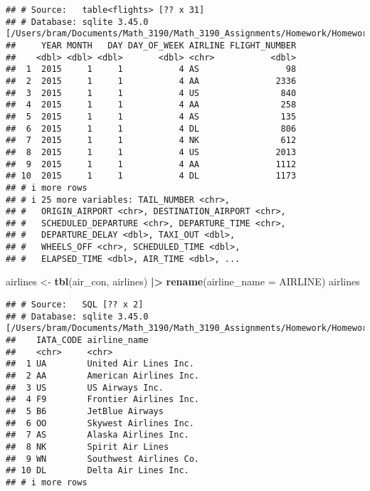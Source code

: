 \documentclass[
]{article}
\newenvironment{Shaded}{\begin{snugshade}}{\end{snugshade}}
\newcommand{\AttributeTok}[1]{\textcolor[rgb]{0.13,0.29,0.53}{#1}}
\newcommand{\FunctionTok}[1]{\textcolor[rgb]{0.13,0.29,0.53}{\textbf{#1}}}
\newcommand{\NormalTok}[1]{#1}
\newcommand{\OtherTok}[1]{\textcolor[rgb]{0.56,0.35,0.01}{#1}}
\newcommand{\SpecialCharTok}[1]{\textcolor[rgb]{0.81,0.36,0.00}{\textbf{#1}}}
\newcommand{\StringTok}[1]{\textcolor[rgb]{0.31,0.60,0.02}{#1}}
\begin{document}
\begin{verbatim}
## # Source:   table<flights> [?? x 31]
## # Database: sqlite 3.45.0 [/Users/bram/Documents/Math_3190/Math_3190_Assignments/Homework/Homework_2/flight_data/airBTS.sqlite]
##     YEAR MONTH   DAY DAY_OF_WEEK AIRLINE FLIGHT_NUMBER
##    <dbl> <dbl> <dbl>       <dbl> <chr>           <dbl>
##  1  2015     1     1           4 AS                 98
##  2  2015     1     1           4 AA               2336
##  3  2015     1     1           4 US                840
##  4  2015     1     1           4 AA                258
##  5  2015     1     1           4 AS                135
##  6  2015     1     1           4 DL                806
##  7  2015     1     1           4 NK                612
##  8  2015     1     1           4 US               2013
##  9  2015     1     1           4 AA               1112
## 10  2015     1     1           4 DL               1173
## # i more rows
## # i 25 more variables: TAIL_NUMBER <chr>,
## #   ORIGIN_AIRPORT <chr>, DESTINATION_AIRPORT <chr>,
## #   SCHEDULED_DEPARTURE <chr>, DEPARTURE_TIME <chr>,
## #   DEPARTURE_DELAY <dbl>, TAXI_OUT <dbl>,
## #   WHEELS_OFF <chr>, SCHEDULED_TIME <dbl>,
## #   ELAPSED_TIME <dbl>, AIR_TIME <dbl>, ...
\end{verbatim}

\begin{Shaded}
\begin{Highlighting}[]
\NormalTok{airlines }\OtherTok{\textless{}{-}} \FunctionTok{tbl}\NormalTok{(air\_con, }\StringTok{\textquotesingle{}airlines\textquotesingle{}}\NormalTok{) }\SpecialCharTok{|\textgreater{}} 
  \FunctionTok{rename}\NormalTok{(}\AttributeTok{airline\_name =}\NormalTok{ AIRLINE)}
\NormalTok{airlines}
\end{Highlighting}
\end{Shaded}

\begin{verbatim}
## # Source:   SQL [?? x 2]
## # Database: sqlite 3.45.0 [/Users/bram/Documents/Math_3190/Math_3190_Assignments/Homework/Homework_2/flight_data/airBTS.sqlite]
##    IATA_CODE airline_name          
##    <chr>     <chr>                 
##  1 UA        United Air Lines Inc. 
##  2 AA        American Airlines Inc.
##  3 US        US Airways Inc.       
##  4 F9        Frontier Airlines Inc.
##  5 B6        JetBlue Airways       
##  6 OO        Skywest Airlines Inc. 
##  7 AS        Alaska Airlines Inc.  
##  8 NK        Spirit Air Lines      
##  9 WN        Southwest Airlines Co.
## 10 DL        Delta Air Lines Inc.  
## # i more rows
\end{verbatim}
\end{document}
